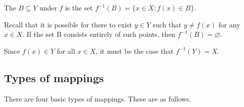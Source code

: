 \documentclass[letterpaper,10pt,english]{jupyterBook}
\begin{document}
\sphinxAtStartPar
The  \(B \subseteq Y\) under \(f\) is the set \(f^{−1}(B) = \{x \in X : f(x) \in B\}\).

\sphinxAtStartPar
Recall that it is possible for there to exist \(y \in Y\) such that \(y \ne f(x)\) for any \(x \in X\). If the set B consists entirely of such points, then \(f^{−1}(B) = \varnothing\).

\sphinxAtStartPar
Since \(f(x) \in Y\) for all \(x \in X\), it must be the case that \(f^{-1}(Y) = X\).


\subsection{Types of mappings}
\label{\detokenize{03.mappings_functions_correspondences:types-of-mappings}}
\sphinxAtStartPar
There are four basic types of mappings. These are as follows.
\end{document}
